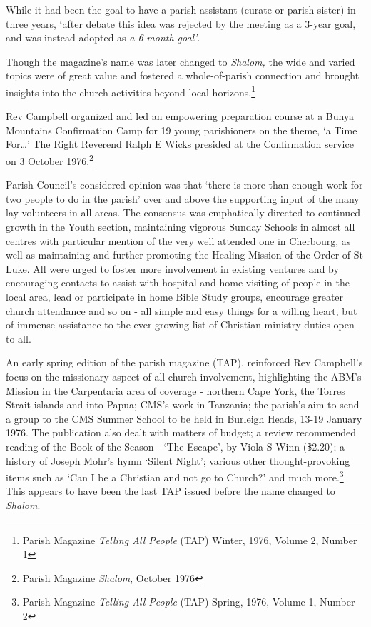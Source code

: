 While it had been the goal to have a parish assistant (curate or parish sister) in three years, `after debate this idea was rejected by the meeting as a 3-year goal, and was instead adopted as \emph{a 6}-\emph{month goal'}.



Though the magazine's name was later changed to \emph{Shalom,} the wide and varied topics were of great value and fostered a whole-of-parish connection and brought insights into the church activities beyond local horizons.\footnote{Parish Magazine \emph{Telling All People} (TAP) Winter, 1976, Volume 2, Number 1}


Rev Campbell organized and led an empowering preparation course at a Bunya Mountains Confirmation Camp for 19 young parishioners on the theme, `a Time For\ldots' The Right Reverend Ralph E Wicks presided at the Confirmation service on 3 October 1976.\footnote{Parish Magazine \emph{Shalom}, October 1976}


Parish Council's considered opinion was that `there is more than enough work for two people to do in the parish' over and above the supporting input of the many lay volunteers in all areas. The consensus was emphatically directed to continued growth in the Youth section, maintaining vigorous Sunday Schools in almost all centres with particular mention of the very well attended one in Cherbourg, as well as maintaining and further promoting the Healing Mission of the Order of St Luke. All were urged to foster more involvement in existing ventures and by encouraging contacts to assist with hospital and home visiting of people in the local area, lead or participate in home Bible Study groups, encourage greater church attendance and so on - all simple and easy things for a willing heart, but of immense assistance to the ever-growing list of Christian ministry duties open to all.



An early spring edition of the parish magazine (TAP), reinforced Rev Campbell's focus on the missionary aspect of all church involvement, highlighting the ABM's Mission in the Carpentaria area of coverage - northern Cape York, the Torres Strait islands and into Papua; CMS's work in Tanzania; the parish's aim to send a group to the CMS Summer School to be held in Burleigh Heads, 13-19 January 1976. The publication also dealt with matters of budget; a review recommended reading of the Book of the Season - `The Escape', by Viola S Winn (\$2.20); a history of Joseph Mohr's hymn `Silent Night'; various other thought-provoking items such as `Can I be a Christian and not go to Church?' and much more.\footnote{Parish Magazine \emph{Telling All People} (TAP) Spring, 1976, Volume 1, Number 2} This appears to have been the last TAP issued before the name changed to \emph{Shalom}.








